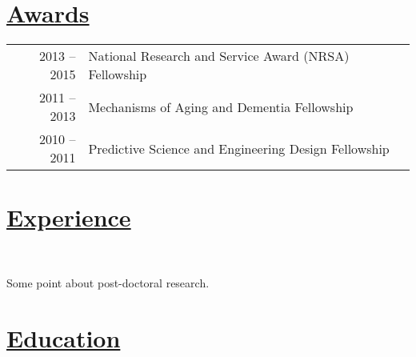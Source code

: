 \documentclass[]{winter-resume-openfont}
\begin{document}
\begin{minipage}[t]{0.65\textwidth}
\sectionsep





\section{\underline{Awards}}
\begin{tabular}{rll}
2013 – 2015	     &  National Research and Service Award (NRSA) Fellowship\\
2011 – 2013	     & Mechanisms of Aging and Dementia Fellowship\\
2010 – 2011	     & Predictive Science and Engineering Design Fellowship\\
\end{tabular}
\sectionsep

\section{\underline{Experience}}
 \\
\begin{tightemize}
\item Some point about post-doctoral research.
\end{tightemize}

\sectionsep

\section{\underline{Education}}
 \\


\end{minipage}
\end{document}
